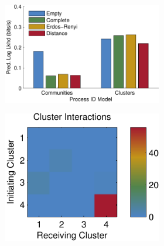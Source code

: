 \begin{figure}[!t]
  \begin{center}
    \begin{subfigure}[T]{.32\textwidth}
      \begin{subfigure}[T]{\textwidth}
        \begin{center}
          \caption{}
          \includegraphics[width=\linewidth]{figures/ch2/icpsr_pred_ll}
          \label{fig:chicago_predll}
        \end{center}
      \end{subfigure}
      \begin{subfigure}[B]{\textwidth}
        \vspace{1em}
        \begin{center}
          \caption{}
          \includegraphics[width=.7\linewidth]{figures/ch2/icpsr_interactions}\\
          \label{fig:chicago_interactions}
        \end{center}
      \end{subfigure}

\end{subfigure}
\end{center}
\end{figure}
